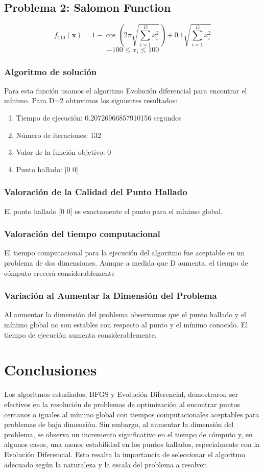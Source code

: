 \documentclass{article}
\begin{document}
\subsection{Problema 2: Salomon Function}

$$
$$\[
f_{110}(\mathbf{x}) = 1 - \cos\left(2\pi \sqrt{\sum_{i=1}^{D} x_i^2}\right) + 0.1 \sqrt{\sum_{i=1}^{D} x_i^2}
\]
$$
	-100 \leq x_i \leq 100
$$

\subsubsection{Algoritmo de solución}
Para esta función usamos el algoritmo Evolución diferencial para encontrar el mínimo. Para D=2 obtuvimos los siguientes resultados:

\begin{enumerate}
	\item Tiempo de ejecución: 0.20726966857910156 segundos
	\item Número de iteraciones: 132
	\item Valor de la función objetivo: 0
        \item Punto hallado: [0 0]
\end{enumerate}


\subsubsection{Valoración de la Calidad del Punto Hallado}
El punto hallado [0 0] es exactamente el punto para el mínimo global.

\subsubsection{Valoración del tiempo computacional}
El tiempo computacional para la ejecución del algoritmo fue aceptable en un problema de dos dimensiones. Aunque a medida que D aumenta, el tiempo de cómputo crecerá considerablemente

\subsubsection{Variación al Aumentar la Dimensión del Problema}

Al aumentar la dimensión del problema observamos que el punto hallado y el mínimo global no son estables con respecto al punto y el mínimo conocido. El tiempo de ejecución aumenta considerablemente.


\section{Conclusiones}

Los algoritmos estudiados, BFGS y Evolución Diferencial, demostraron ser efectivos en la resolución de problemas de optimización al encontrar puntos cercanos o iguales al mínimo global con tiempos computacionales aceptables para problemas de baja dimensión. Sin embargo, al aumentar la dimensión del problema, se observa un incremento significativo en el tiempo de cómputo y, en algunos casos, una menor estabilidad en los puntos hallados, especialmente con la Evolución Diferencial. Esto resalta la importancia de seleccionar el algoritmo adecuado según la naturaleza y la escala del problema a resolver.
\end{document}
